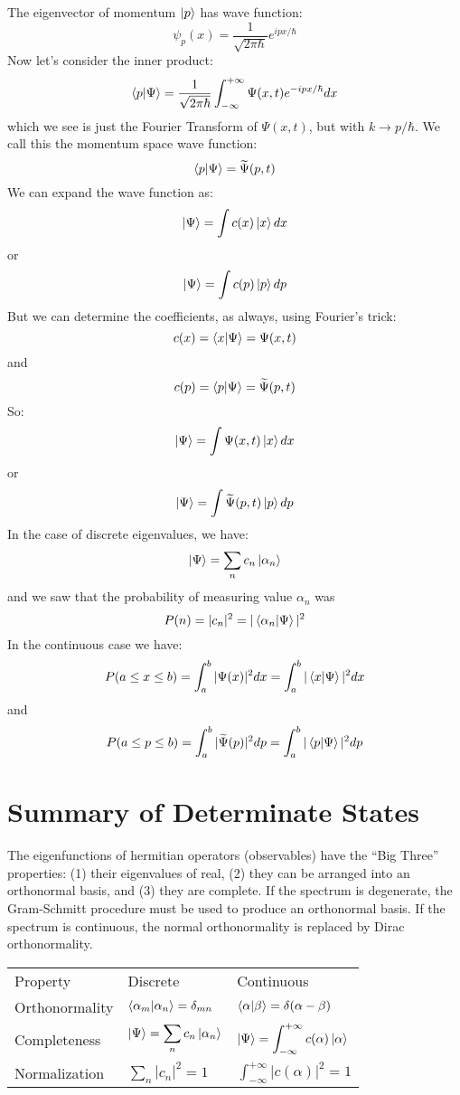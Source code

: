 \documentclass[12pt]{book}
\begin{document}
The eigenvector of momentum $\ket{p}$ has wave function:
$$\psi_p(x) = \frac{1}{\sqrt{2\pi \hbar}} e^{\displaystyle i p x / \hbar}$$
Now let's consider the inner product:
$$\braket{p|\Psi} = \frac{1}{\sqrt{2\pi\hbar}}\int_{-\infty}^{+\infty} \Psi(x,t) e^{-ipx/\hbar} dx $$
which we see is just the Fourier Transform of $\Psi(x,t)$, but with $k \to p/\hbar$.   We call this the momentum space wave function:
$$\braket{p|\Psi} = \widetilde{\Psi}(p,t)$$
We can expand the wave function as:
$$\ket{\Psi} = \int c(x) \ket{x} dx$$
or
$$\ket{\Psi} = \int c(p) \ket{p} dp$$
But we can determine the coefficients, as always, using Fourier's trick:
$$c(x) = \braket{x|\Psi} = \Psi(x,t)$$
and
$$c(p) = \braket{p|\Psi} = \widetilde{\Psi}(p,t)$$
So:
$$\ket{\Psi} = \int \Psi(x,t) \ket{x} dx$$
or
$$\ket{\Psi} = \int \widetilde{\Psi}(p,t) \ket{p} dp$$
In the case of discrete eigenvalues, we have:
$$\ket{\Psi} = \sum_n c_n \ket{\alpha_n}$$
and we saw that the probability of measuring value $\alpha_n$ was 
$$P(n) = |c_n|^2 = |\braket{\alpha_n|\Psi}|^2$$
In the continuous case we have:
$$P(a\leq x \leq b) = \int_{a}^{b}|\Psi(x)|^2 dx = \int_{a}^{b}|\braket{x|\Psi}|^2 dx$$
and
$$P(a \leq p \leq b) = \int_{a}^{b}|\widetilde{\Psi}(p)|^2 dp = \int_{a}^{b}|\braket{p|\Psi}|^2 dp$$

 
\section{Summary of Determinate States}

The eigenfunctions of hermitian operators (observables) have the ``Big
Three'' properties: (1) their eigenvalues of real, (2) they can be
arranged into an orthonormal basis, and (3) they are complete.  If the
spectrum is degenerate, the Gram-Schmitt procedure must be used to
produce an orthonormal basis.  If the spectrum is continuous, the
normal orthonormality is replaced by Dirac orthonormality.

\begin{center}
\begin{tabular}{lll}
Property       & Discrete & Continuous \\[8pt]
Orthonormality & $\braket{\alpha_m|\alpha_n} = \delta_{mn}$ & $\braket{\alpha|\beta} = \delta(\alpha-\beta)$ \\[8pt]
Completeness   & $\displaystyle \ket{\Psi} = \sum_n c_n \ket{\alpha_n}$ & 
$\displaystyle \ket{\Psi} = \int_{-\infty}^{+\infty} c(\alpha) \ket{\alpha}$\\[8pt]
Normalization  & $\displaystyle \sum_n |c_n|^2 = 1$ & 
$\displaystyle \int_{-\infty}^{+\infty} |c(\alpha)|^2  = 1$ \\[8pt]
\end{tabular}
\end{center}
\end{document}
